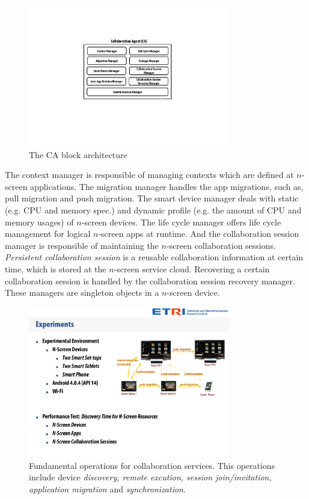 \documentclass[conference]{IEEEtran}
\begin{document}
    \begin{figure}[htb] %
    \centering
    \includegraphics[width=8.8cm,keepaspectratio]{collaborationagent}
    \caption{The CA block architecture}
    \label{fig:collaborationagent}
    \end{figure}

The context manager is responsible of managing contexts which are defined at $n$-screen applications. The migration manager handles the app migrations, such as, pull migration and push migration. 
The smart device manager deals with static (e.g. CPU and memory spec.) and dynamic profile (e.g. the amount of CPU and memory usages) of $n$-screen devices.
The life cycle manager offers life cycle management for logical $n$-screen apps at runtime.
And the collaboration session manager is responsible of maintaining the $n$-screen collaboration sessions.
\textit{Persistent collaboration session} is a reusable collaboration information at certain time, which is stored at the $n$-screen service cloud.
Recovering a certain collaboration session is handled by the collaboration session recovery manager.
These managers are singleton objects in a $n$-screen device.

 \begin{figure}[htb] %
 \centering
 \includegraphics[width=8.8cm,keepaspectratio]{concepts}
 \caption{Fundamental operations for collaboration services. This operations include device \textit{discovery, remote excution, session join/invitation, application migration} and  \textit{synchronization}.}
 \label{fig:operations}
 \end{figure}
\end{document}
